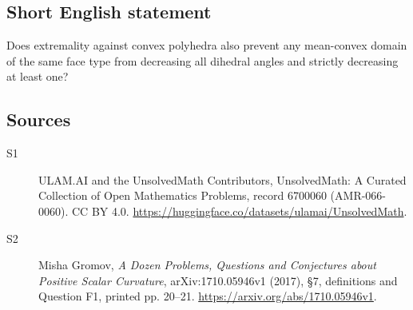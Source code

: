 \documentclass[11pt]{article}
\begin{document}
\subsection{Short English statement}
Does extremality against convex polyhedra also prevent any mean-convex domain of the same face type from decreasing all dihedral angles and strictly decreasing at least one?
\subsection{Sources}
\begin{description}
\item[\hypertarget{source:6700060:1}{S1}] ULAM.AI and the UnsolvedMath Contributors, UnsolvedMath: A Curated Collection of Open Mathematics Problems, record 6700060 (AMR-066-0060). CC BY 4.0. \url{https://huggingface.co/datasets/ulamai/UnsolvedMath}.
\item[\hypertarget{source:6700060:2}{S2}] Misha Gromov, \emph{A Dozen Problems, Questions and Conjectures about Positive Scalar Curvature}, arXiv:1710.05946v1 (2017), \S7, definitions and Question F1, printed pp. 20--21. \url{https://arxiv.org/abs/1710.05946v1}.
\end{description}
\label{end:6700060}
\end{document}
